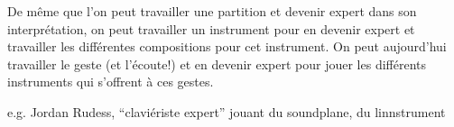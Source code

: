 De même que l'on peut travailler une partition et devenir expert dans son interprétation, on peut travailler un instrument pour en devenir expert et travailler les différentes compositions pour cet instrument. On peut aujourd'hui travailler le geste (et l'écoute!) et en devenir expert pour jouer les différents instruments qui s'offrent à ces gestes.

e.g. Jordan Rudess, ``claviériste expert'' jouant du soundplane, du linnstrument
